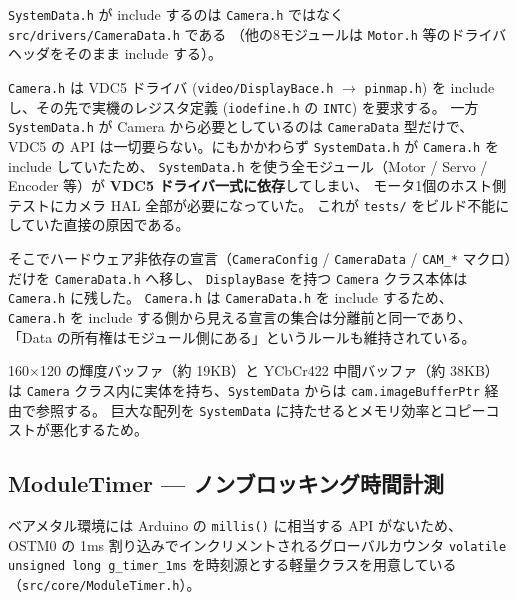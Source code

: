 \documentclass[a4paper,11pt,dvipdfmx]{jsarticle}
\begin{document}
\begin{notebox}
\texttt{SystemData.h} が include するのは
\texttt{Camera.h} ではなく \texttt{src/drivers/CameraData.h} である
（他の8モジュールは \texttt{Motor.h} 等のドライバヘッダをそのまま include する）。

\texttt{Camera.h} は VDC5 ドライバ (\texttt{video/DisplayBace.h} $\rightarrow$
\texttt{pinmap.h}) を include し、その先で実機のレジスタ定義
(\texttt{iodefine.h} の \texttt{INTC}) を要求する。
一方 \texttt{SystemData.h} が Camera から必要としているのは \texttt{CameraData} 型だけで、
VDC5 の API は一切要らない。にもかかわらず \texttt{SystemData.h} が
\texttt{Camera.h} を include していたため、
\texttt{SystemData.h} を使う全モジュール（Motor / Servo / Encoder 等）が
\textbf{VDC5 ドライバ一式に依存}してしまい、
モータ1個のホスト側テストにカメラ HAL 全部が必要になっていた。
これが \texttt{tests/} をビルド不能にしていた直接の原因である。

そこでハードウェア非依存の宣言（\texttt{CameraConfig} / \texttt{CameraData} /
\texttt{CAM\_*} マクロ）だけを \texttt{CameraData.h} へ移し、
\texttt{DisplayBase} を持つ \texttt{Camera} クラス本体は \texttt{Camera.h} に残した。
\texttt{Camera.h} は \texttt{CameraData.h} を include するため、
\texttt{Camera.h} を include する側から見える宣言の集合は分離前と同一であり、
「Data の所有権はモジュール側にある」というルールも維持されている。
\end{notebox}

\begin{cautionbox}
160$\times$120 の輝度バッファ（約 19KB）と YCbCr422 中間バッファ（約 38KB）は
\texttt{Camera} クラス内に実体を持ち、\texttt{SystemData} からは
\texttt{cam.imageBufferPtr} 経由で参照する。
巨大な配列を \texttt{SystemData} に持たせるとメモリ効率とコピーコストが悪化するため。
\end{cautionbox}

\subsection{ModuleTimer --- ノンブロッキング時間計測}\label{sec:moduletimer}

ベアメタル環境には Arduino の \texttt{millis()} に相当する API がないため、
OSTM0 の 1ms 割り込みでインクリメントされるグローバルカウンタ
\texttt{volatile unsigned long g\_timer\_1ms} を時刻源とする軽量クラスを用意している
（\texttt{src/core/ModuleTimer.h}）。
\end{document}
